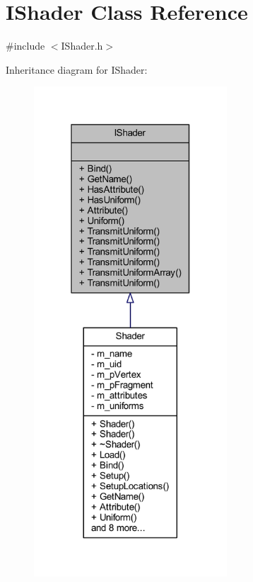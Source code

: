 \hypertarget{class_i_shader}{}\section{I\+Shader Class Reference}
\label{class_i_shader}


{\ttfamily \#include $<$I\+Shader.\+h$>$}



Inheritance diagram for I\+Shader\+:\nopagebreak
\begin{figure}[H]
\begin{center}
\leavevmode
\includegraphics[width=205pt]{class_i_shader__inherit__graph}
\end{center}
\end{figure}


